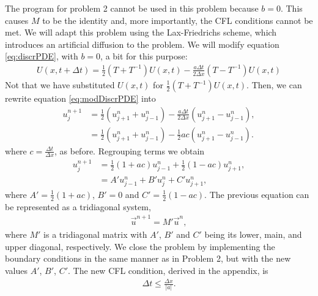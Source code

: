 \begin{questions}
\begin{solution}
\end{solution}
\begin{solution}
The program for problem 2 cannot be used in this problem because $b=0$. This causes $M$ to be the identity and, more importantly, the CFL conditions cannot be met. We will adapt this problem using the Lax-Friedrichs scheme, which introduces an artificial diffusion to the problem. We will modify equation \eqref{eq:discrPDE}, with $b=0$, a bit for this purpose:
\begin{align}\label{eq:modDiscrPDE}
U(x, t+\Delta t) =\frac{1}{2}\left(T+T^{-1}\right) U(x, t)-\frac{a\Delta t}{ 2\Delta x}(T-T^{-1})U(x,t)
\end{align}
Not that we have substituted $U(x,t)$ for $\frac{1}{2}\left(T+T^{-1}\right) U(x, t)$. Then, we can rewrite equation \eqref{eq:modDiscrPDE} into
\begin{align*}
u_j^{n+1} &= \frac{1}{2}\left(u_{j+1}^n+u_{j-1}^n\right)-\frac{a\Delta t}{2\Delta x}\left(u_{j+1}^n-u_{j-1}^n\right),\\
&= \frac{1}{2}\left(u_{j+1}^n+u_{j-1}^n\right)-\frac{1}{2}ac\left(u_{j+1}^n-u_{j-1}^n\right).
\end{align*}
where $c = \frac{\Delta t}{\Delta x}$, as before. Regrouping terms we obtain
\begin{align}\label{eq:reducedForm}
u_j^{n+1} &= \frac{1}{2}\left(1+ac\right)u_{j-1}^n+\frac{1}{2}\left(1-ac\right)u_{j+1}^n,\nonumber\\
&= A'u_{j-1}^n + B'u_j^n + C'u_{j+1}^n,
\end{align}
where $A' = \frac{1}{2}\left(1+ac\right)$, $B' = 0$ and $C' = \frac{1}{2}\left(1-ac\right)$. The previous equation can be represented as a tridiagonal system,
\begin{align}\label{eq:matrixForm}
\vec{u}^{n+1} = M'\vec{u}^n,
\end{align}
where $M'$ is a tridiagonal matrix with $A'$, $B'$ and $C'$ being its lower, main, and upper diagonal, respectively. We close the problem by implementing the boundary conditions in the same manner as  in Problem 2, but with the new values $A'$, $B'$, $C'$. The new CFL condition, derived in the appendix, is 
\begin{align*}
\Delta t\leq\frac{\Delta x}{|a|}.
\end{align*}


\end{solution}
\end{questions}
